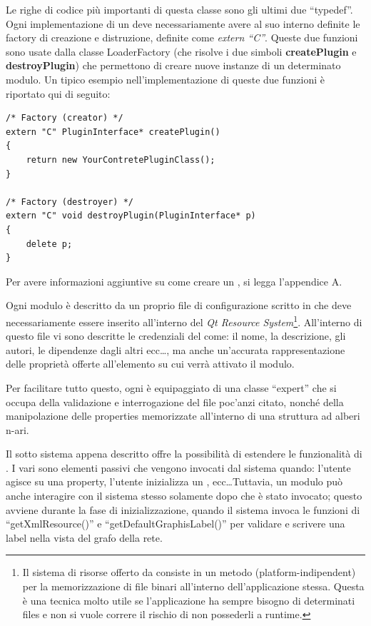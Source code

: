 Le righe di codice più importanti di questa classe sono gli ultimi due ``typedef''. Ogni implementazione di un \plugin{} deve necessariamente avere al suo interno definite le factory di creazione e distruzione, definite come \emph{extern ``C''}. Queste due funzioni sono usate dalla classe LoaderFactory (che risolve i due simboli \textbf{createPlugin} e \textbf{destroyPlugin}) che permettono di creare nuove instanze di un determinato modulo. Un tipico esempio nell'implementazione di queste due funzioni è riportato qui di seguito:

\begin{lstlisting}
/* Factory (creator) */
extern "C" PluginInterface* createPlugin()
{
	return new YourContretePluginClass();
}

/* Factory (destroyer) */
extern "C" void destroyPlugin(PluginInterface* p)
{
	delete p;
}
\end{lstlisting}
Per avere informazioni aggiuntive su come creare un \plugin{}, si legga l'appendice A.

Ogni modulo è descritto da un proprio file di configurazione scritto in \xml{} che deve necessariamente essere inserito all'interno del \emph{Qt Resource System}\footnote{Il sistema di risorse offerto da \qt{} consiste in un metodo (platform-indipendent) per la memorizzazione di file binari all'interno dell'applicazione stessa. Questa è una tecnica molto utile se l'applicazione ha sempre bisogno di determinati files e non si vuole correre il rischio di non possederli a runtime.}. All'interno di questo file vi sono descritte le credenziali del \plugin{} come: il nome, la descrizione, gli autori, le dipendenze dagli altri \plugin{} ecc\ldots, ma anche un'accurata rappresentazione delle proprietà offerte all'elemento su cui verrà attivato il modulo.

Per facilitare tutto questo, ogni \proxy{} è equipaggiato di una classe ``expert'' che si occupa della validazione e interrogazione del file \xml{} poc'anzi citato, nonché della manipolazione delle properties memorizzate all'interno di una struttura ad alberi n-ari.

Il sotto sistema appena descritto offre la possibilità di estendere le funzionalità di \visualnetkit{}. I vari \plugin{} sono elementi passivi che vengono invocati dal sistema quando: l'utente agisce su una property, l'utente inizializza un \plugin{}, ecc\ldots Tuttavia, un modulo può anche interagire con il sistema stesso solamente dopo che è stato invocato; questo avviene durante la fase di inizializzazione, quando il sistema invoca le funzioni di ``getXmlResource()'' e ``getDefaultGraphisLabel()'' per validare e scrivere una label nella vista del grafo della rete.

